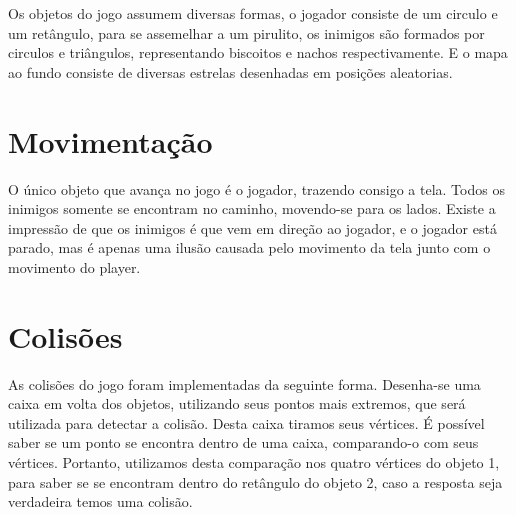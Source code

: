 \documentclass[12pt]{article}
\begin{document}
Os objetos do jogo assumem diversas formas, o jogador consiste de um circulo e um retângulo, para se assemelhar a um pirulito, os inimigos são formados por circulos e triângulos, representando biscoitos e nachos respectivamente. E o mapa ao fundo consiste de diversas estrelas desenhadas em posições aleatorias.

\section{Movimentação}

O único objeto que avança no jogo é o jogador, trazendo consigo a tela. Todos os inimigos somente se encontram no caminho, movendo-se para os lados. Existe a impressão de que os inimigos é que vem em direção ao jogador, e o jogador está parado, mas é apenas uma ilusão causada pelo movimento da tela junto com o movimento do player.

\section{Colisões}

As colisões do jogo foram implementadas da seguinte forma. Desenha-se uma caixa em volta dos objetos, utilizando seus pontos mais extremos, que será utilizada para detectar a colisão. Desta caixa tiramos seus vértices. É possível saber se um ponto se encontra dentro de uma caixa, comparando-o com seus vértices. Portanto, utilizamos desta comparação nos quatro vértices do objeto 1, para saber se se encontram dentro do retângulo do objeto 2, caso a resposta seja verdadeira temos uma colisão.
\end{document}
